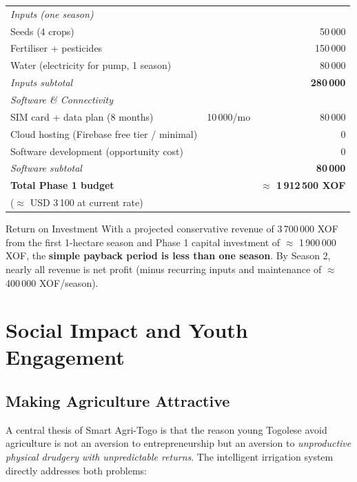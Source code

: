 \documentclass[12pt, a4paper]{report}
\begin{document}
\begin{table}[H]
\begin{tabular}{lrr}
\midrule
\multicolumn{3}{l}{\textit{Inputs (one season)}}\\
\quad Seeds (4 crops) & & 50\,000 \\
\quad Fertiliser + pesticides & & 150\,000 \\
\quad Water (electricity for pump, 1 season) & & 80\,000 \\
\midrule
\textit{Inputs subtotal} & & \textbf{280\,000} \\
\midrule
\multicolumn{3}{l}{\textit{Software \& Connectivity}}\\
\quad SIM card + data plan (8 months) & 10\,000/mo & 80\,000 \\
\quad Cloud hosting (Firebase free tier / minimal) & & 0 \\
\quad Software development (opportunity cost) & & 0 \\
\midrule
\textit{Software subtotal} & & \textbf{80\,000} \\
\midrule
\textbf{Total Phase 1 budget} & & \textbf{$\approx$ 1\,912\,500 XOF}\\
\quad ($\approx$ USD 3\,100 at current rate) & & \\
\bottomrule
\end{tabular}
\end{table}

\begin{keybox}{Return on Investment}
With a projected conservative revenue of 3\,700\,000 XOF from the first 1-hectare season and Phase 1 capital investment of $\approx$ 1\,900\,000 XOF, the \textbf{simple payback period is less than one season}. By Season 2, nearly all revenue is net profit (minus recurring inputs and maintenance of $\approx$ 400\,000 XOF/season).
\end{keybox}

\chapter{Social Impact and Youth Engagement}

\section{Making Agriculture Attractive}

A central thesis of Smart Agri-Togo is that the reason young Togolese avoid agriculture is not an aversion to entrepreneurship but an aversion to \textit{unproductive physical drudgery with unpredictable returns}. The intelligent irrigation system directly addresses both problems:
\end{document}
